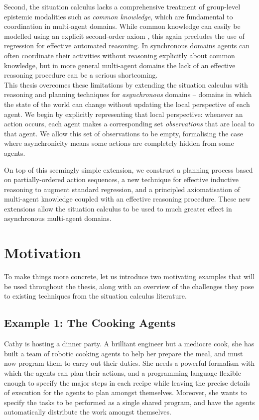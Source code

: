 Second, the situation calculus lacks a comprehensive treatment of
group-level epistemic modalities such as \emph{common knowledge},
which are fundamental to coordination in multi-agent domains. While
common knowledge can easily be modelled using an explicit second-order
axiom \citep{delgrande01sitcalc_cleudo,davis05fo_ma_theory,ghaderi07sc_joint_ability},
this again precludes the use of regression for effective automated
reasoning. In synchronous domains agents can often coordinate their
activities without reasoning explicitly about common knowledge, but
in more general multi-agent domains the lack of an effective reasoning
procedure can be a serious shortcoming.\\


This thesis overcomes these limitations by extending the situation
calculus with reasoning and planning techniques for \emph{asynchronous}
domains -- domains in which the state of the world can change without
updating the local perspective of each agent. We begin by explicitly
representing that local perspective: whenever an action occurs, each
agent makes a corresponding set \emph{observations} that are local
to that agent. We allow this set of observations to be empty, formalising
the case where asynchronicity means some actions are completely hidden
from some agents.

On top of this seemingly simple extension, we construct a planning
process based on partially-ordered action sequences, a new technique
for effective inductive reasoning to augment standard regression,
and a principled axiomatisation of multi-agent knowledge coupled with
an effective reasoning procedure. These new extensions allow the situation
calculus to be used to much greater effect in asynchronous multi-agent
domains.\newpage{}


\section{Motivation}

To make things more concrete, let us introduce two motivating examples
that will be used throughout the thesis, along with an overview of
the challenges they pose to existing techniques from the situation
calculus literature.


\subsection*{Example 1: The Cooking Agents}

Cathy is hosting a dinner party. A brilliant engineer but a mediocre
cook, she has built a team of robotic cooking agents to help her prepare
the meal, and must now program them to carry out their duties. She
needs a powerful formalism with which the agents can plan their actions,
and a programming language flexible enough to specify the major steps
in each recipe while leaving the precise details of execution for
the agents to plan amongst themselves. Moreover, she wants to specify
the tasks to be performed as a single shared program, and have the
agents automatically distribute the work amongst themselves.\\


